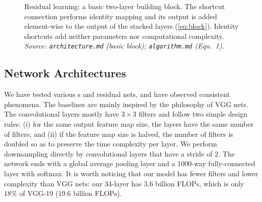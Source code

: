 \begin{figure}[t]
\centering
{}
\caption{Residual learning: a basic two-layer building block. The shortcut
connection performs identity mapping and its output is added element-wise to the
output of the stacked layers (\cref{eq:block}). Identity shortcuts add neither
parameters nor computational complexity. \emph{Source:
\texttt{architecture.md} (basic block); \texttt{algorithm.md} (Eqn.~1).}}
\label{fig:resblock}
\end{figure}

\subsection{Network Architectures}
\label{sec:arch}
We have tested various \plainnet{}s and residual nets, and have observed
consistent phenomena. The \plainnet{} baselines are mainly inspired by the
philosophy of VGG nets. The convolutional layers mostly have $3\times3$ filters
and follow two simple design rules: (i) for the same output feature map size,
the layers have the same number of filters; and (ii) if the feature map size is
halved, the number of filters is doubled so as to preserve the time complexity
per layer. We perform downsampling directly by convolutional layers that have a
stride of $2$. The network ends with a global average pooling layer and a
1000-way fully-connected layer with softmax. It is worth noticing that our model
has fewer filters and lower complexity than VGG nets: our 34-layer \plainnet{}
has $3.6$ billion FLOPs, which is only $18\%$ of VGG-19 ($19.6$ billion FLOPs).

